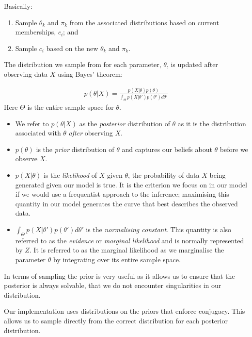 \documentclass[11pt]{article} %
\begin{document}
Basically:
\begin{enumerate}
 \item Sample $\theta_k$ and $\pi_k$ from the associated distributions based on current memberships, $c_i$; and
 \item Sample $c_i$ based on the new $\theta_k$ and $\pi_k$.
\end{enumerate}
The distribution we sample from for each parameter, $\theta$, is updated after observing data $X$ using Bayes' theorem:

\begin{align} \label{Bayes_theorem}
p(\theta | X) = \frac{p(X | \theta) p(\theta)}{\int_\Theta p(X | \theta ') p(\theta ') d \theta '}
\end{align}
Here $\Theta$ is the entire sample space for $\theta$. 
\begin{itemize}
 \item We refer to $p(\theta | X)$ as the \emph{posterior} distribution of $\theta$ as it is the distribution associated with $\theta$ \emph{after} observing $X$.
 \item $p(\theta)$ is the \emph{prior} distribution of $\theta$ and captures our beliefs about $\theta$ before we observe $X$.
 \item $p(X | \theta)$ is the \emph{likelihood} of $X$ given $\theta$, the probability of data $X$ being generated given our model is true. It is the criterion we focus on in our model if we would use a frequentist approach to the inference; maximising this quantity in our model generates the curve that best describes the observed data. 
 \item $\int_\Theta p(X | \theta ') p(\theta ') d \theta '$ is the \emph{normalising constant}. This quantity is also referred to as the \emph{evidence} \cite{MacKayInformationTheoryInference2003} or \emph{marginal likelihood} and is normally represented by $Z$. It is referred to as the marginal likelihood as we marginalise the parameter $\theta$ by integrating over its entire sample space.
\end{itemize}

In terms of sampling the prior is very useful as it allows us to ensure that the posterior is always solvable, that we do not encounter singularities in our distribution.

Our implementation uses distributions on the priors that enforce conjugacy. This allows us to sample directly from the correct distribution for each posterior distribution.
\end{document}
